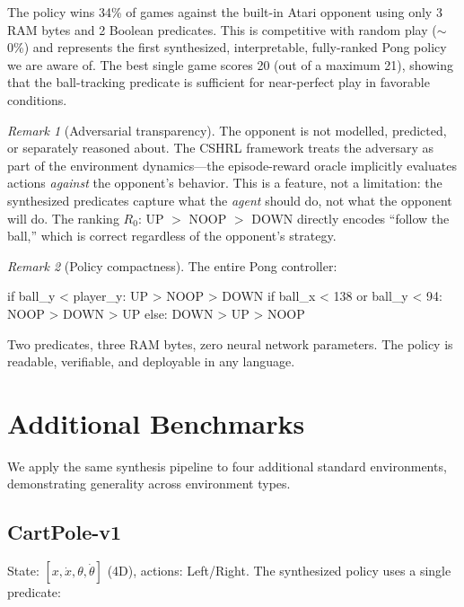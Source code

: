 \documentclass[9pt,a4paper]{article}
\theoremstyle{plain}
\theoremstyle{definition}
\theoremstyle{remark}
\newtheorem{remark}{Remark}
\begin{document}
The policy wins 34\% of games against the built-in Atari opponent
using only 3 RAM bytes and 2 Boolean predicates. This is
competitive with random play ($\sim$0\%) and represents the first
synthesized, interpretable, fully-ranked Pong policy we are aware
of. The best single game scores 20 (out of a maximum 21), showing
that the ball-tracking predicate is sufficient for near-perfect
play in favorable conditions.

\begin{remark}[Adversarial transparency]
The opponent is not modelled, predicted, or separately reasoned
about. The CSHRL framework treats the adversary as part of the
environment dynamics---the episode-reward oracle implicitly
evaluates actions \emph{against} the opponent's behavior. This
is a feature, not a limitation: the synthesized predicates
capture what the \emph{agent} should do, not what the opponent
will do. The ranking $R_0$: UP $>$ NOOP $>$ DOWN directly
encodes ``follow the ball,'' which is correct regardless of the
opponent's strategy.
\end{remark}

\begin{remark}[Policy compactness]
The entire Pong controller:
\begin{spec}
  if ball_y < player_y:    UP > NOOP > DOWN
  if ball_x < 138 or
     ball_y < 94:          NOOP > DOWN > UP
  else:                    DOWN > UP > NOOP
\end{spec}
Two predicates, three RAM bytes, zero neural network parameters.
The policy is readable, verifiable, and deployable in any language.
\end{remark}

\section{Additional Benchmarks}
\label{sec:benchmarks}

We apply the same synthesis pipeline to four additional standard
environments, demonstrating generality across environment types.

\subsection{CartPole-v1}

State: $[x, \dot{x}, \theta, \dot{\theta}]$ (4D), actions:
Left/Right. The synthesized policy uses a single predicate:
\end{document}

